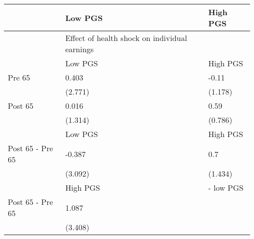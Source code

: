 % 
\begin{tabular}{lll}
  \hline
 & Low PGS & High PGS \\ 
  \hline
 & Effect of health shock on individual earnings &  \\ 
   & Low PGS & High PGS \\ 
  Pre 65 & 0.403 & -0.11 \\ 
   & (2.771) & (1.178) \\ 
  Post 65 & 0.016 & 0.59 \\ 
   & (1.314) & (0.786) \\ 
   & Low PGS & High PGS \\ 
  Post 65 - Pre 65 & -0.387 & 0.7 \\ 
   & (3.092) & (1.434) \\ 
   & High PGS  & - low PGS \\ 
  Post 65 - Pre 65 & 1.087 &  \\ 
   & (3.408) &  \\ 
   \hline
\end{tabular}
